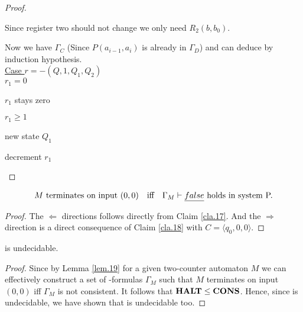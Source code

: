 \begin{proof}
	\begin{figure}[H]
		
	\end{figure}
	Since register two should not change we only need $R_2(b,b_0)$.
	
	\begin{figure}[H]
		
	\end{figure}
	Now we have $\Gamma_C$ (Since $P(a_{i-1},a_i)$ is already in $\Gamma_D$) and can deduce \false{} by induction hypothesis.\\
	\underline{Case $r=-(Q,1,Q_1,Q_2)$}
	\\\uline{$r_1=0$}
	
	\begin{figure}[H]
		
	\end{figure}
	
	$r_1$ stays zero
	
	\begin{figure}[H]
		
	\end{figure}
	\uline{$r_1\geq1$}
	
	new state $Q_1$
	
	\begin{figure}[H]
		
	\end{figure}
	
	decrement $r_1$
	
	\begin{figure}[H]
		
	\end{figure}
	
\end{proof}

\begin{lemma}\label{lem.19}
	\begin{align*} %
		  & \text{$M$ terminates on input $(0,0)$} &   & \text{iff} & \text{$\Gamma_M\vdash\false$ holds in system P.} 
	\end{align*}
\end{lemma}
\begin{proof}
	The $\Leftarrow$ directions follows directly from Claim \ref{cla.17}. And the $\Rightarrow$ direction is a direct consequence of Claim \ref{cla.18} with $C=\langle q_0,0,0\rangle$.
\end{proof}

\begin{theorem}
	\PCons{} is undecidable.
\end{theorem}
\begin{proof}
	Since by Lemma \ref{lem.19} for a given two-counter automaton $M$ we can effectively construct a set of \SysP-formulas $\Gamma_M$ such that $M$ terminates on input $(0,0)$ iff $\Gamma_M$ is not consistent. It follows that $\textbf{HALT}\leq\textbf{CONS}$. Hence, since \autHalt{} is undecidable, we have shown that \PCons{} is undecidable too.
\end{proof}
